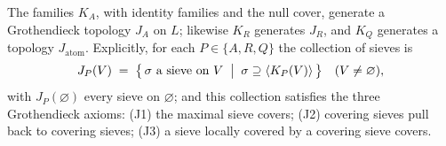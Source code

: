 \begin{theorem}\label{ch09:thm-nt21}
The families $K_{A}$, with identity families and the null cover, generate a Grothendieck topology $J_{A}$ on $L$; likewise $K_{R}$ generates $J_{R}$, and $K_{Q}$ generates a topology $J_{\mathrm{atom}}$. Explicitly, for each $P\in\{A,R,Q\}$ the collection of sieves is
\[
J_{P}(V)\;=\;\bigl\{\,\sigma \text{ a sieve on } V \;\bigm|\; \sigma\supseteq\langle K_{P}(V)\rangle\,\bigr\}
\quad (V\neq\varnothing),
\]
with $J_{P}(\varnothing)$ every sieve on $\varnothing$; and this collection satisfies the three Grothendieck axioms: (J1) the maximal sieve covers; (J2) covering sieves pull back to covering sieves; (J3) a sieve locally covered by a covering sieve covers.
\end{theorem}

